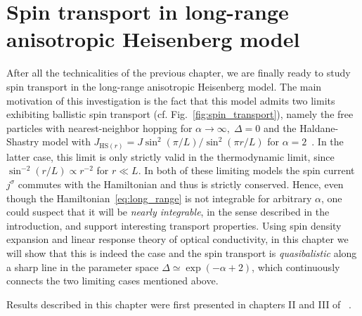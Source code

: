 \chapter{Spin transport in long-range anisotropic Heisenberg model\label{chap:spin_transport}}
\thispagestyle{chapterBeginStyle}

After all the technicalities of the previous chapter, we are finally ready to study spin transport in
the long-range anisotropic Heisenberg model. The main motivation of this investigation is the fact that this model admits
two limits exhibiting ballistic spin transport (cf. Fig.~\ref{fig:spin_transport}), namely the free particles
with nearest-neighbor hopping for \(\alpha\to \infty,\; \Delta = 0\) and the Haldane-Shastry
model with \(J_{\mathrm{HS}(r)} = J \sin^2\left(\pi/L\right)/\sin^2\left(\pi r/L\right)\)
for \(\alpha = 2\)~\autocite{Haldane1988,Shastry1988}. In the latter case, this limit is only strictly valid
in the thermodynamic limit, since \(\sin^{-2}\left(r/L\right)\propto r^{-2}\) for \(r \ll L\).
In both of these limiting models the spin current
\(j^{\sigma}\) commutes with the Hamiltonian and thus is strictly conserved. Hence, even though
the Hamiltonian~\eqref{eq:long_range} is not integrable for arbitrary \(\alpha\), one could suspect
that it will be \textit{nearly integrable}, in the sense described in the introduction, and support
interesting transport properties. Using spin density expansion and linear response theory
of optical conductivity, in this chapter we will show that this is indeed the case and the spin transport is \textit{quasibalistic} along a sharp
line in the parameter space \(\Delta \simeq \exp(- \alpha + 2)\), which continuously connects the two limiting
cases mentioned above.

Results described in this chapter were first presented in chapters II and III of ~\textcite{Mierzejewski2023}.

